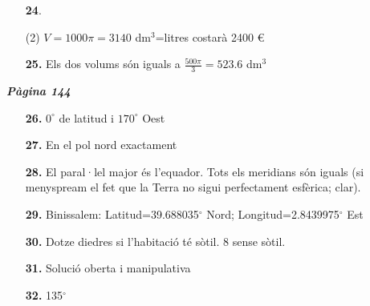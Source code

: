 \documentclass[a4paper, pdf, twoside]{book}
\begin{document}
\begin{multicols}{2}
\begin{enumerate}

 \item[\fontfamily{phv}\selectfont\color{blue}\textbf{24}. ]  \scalebox{0.6}{\simbolclau } 
 \begin{tasks}[column-sep=1em, item-indent=1.3333em](2)
	 \task* $V=1000\pi =3140$ dm$^3$=litres
	 \task costarà 2400 \euro {}
\end{tasks}
\vspace{0.25cm}
\item[\fontfamily{phv}\selectfont\color{blue}\textbf{25. }] 
Els dos volums són iguals a $\frac {500 \pi }{3}=523.6$ dm$^3$
 \end{enumerate}
\vspace{0.3cm}


{\textbf{\em Pàgina 144}} \hrulefill
\begin{enumerate}
\vspace{0.25cm}
\item[\fontfamily{phv}\selectfont\color{blue}\textbf{26. }] 
$0^\circ $ de latitud i $170^\circ $ Oest
 \end{enumerate}
\begin{enumerate}
\vspace{0.25cm}
\item[\fontfamily{phv}\selectfont\color{blue}\textbf{27. }] 
En el pol nord exactament
\vspace{0.25cm}
\item[\fontfamily{phv}\selectfont\color{blue}\textbf{28. }] 
El paral·lel major és l'equador. Tots els meridians són iguals (si menyspream el fet que la Terra no sigui perfectament esfèrica; clar).
\vspace{0.25cm}
\item[\fontfamily{phv}\selectfont\color{blue}\textbf{29. }] 
Binissalem: Latitud=39.688035${}^\circ $ Nord; Longitud=2.8439975${}^\circ $ Est
\vspace{0.25cm}
\item[\fontfamily{phv}\selectfont\color{blue}\textbf{30. }] 
Dotze diedres si l'habitació té sòtil. 8 sense sòtil.
\vspace{0.25cm}
\item[\fontfamily{phv}\selectfont\color{blue}\textbf{31. }] 
Solució oberta i manipulativa
\vspace{0.25cm}
\item[\fontfamily{phv}\selectfont\color{blue}\textbf{32. }] 
135$^\circ $
\vspace{0.25cm}

\end{enumerate}
\end{multicols}
\end{document}

